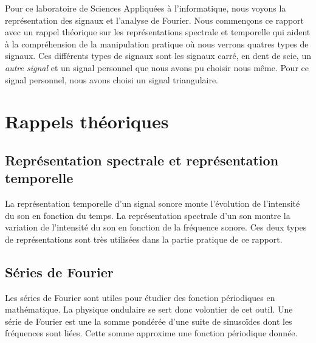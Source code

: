 \documentclass[a4paper]{article}
\begin{document}
Pour ce laboratoire de Sciences Appliquées à l'informatique, nous voyons la représentation des signaux et l'analyse de Fourier. Nous commençons ce rapport avec un rappel théorique sur les représentations spectrale et temporelle qui aident à la compréhension de la manipulation pratique où nous verrons quatres types de signaux. Ces différents types de signaux sont les signaux carré, en dent de scie, un \textit{autre signal} et un signal personnel que nous avons pu choisir nous même. Pour ce signal personnel, nous avons choisi un signal triangulaire.















\section{Rappels théoriques}










\subsection{Représentation spectrale et représentation temporelle}





La représentation temporelle d'un signal sonore monte l'évolution de l'intensité du son en fonction du temps. La représentation spectrale d'un son montre la variation de l'intensité du son en fonction de la fréquence sonore. Ces deux types de représentations sont très utilisées dans la partie pratique de ce rapport.










\subsection{Séries de Fourier}





Les séries de Fourier sont utiles pour étudier des fonction périodiques en mathématique. La physique ondulaire se sert donc volontier de cet outil. Une série de Fourier est une la somme pondérée d'une suite de sinusoïdes dont les fréquences sont liées. Cette somme approxime une fonction périodique donnée.
\end{document}
